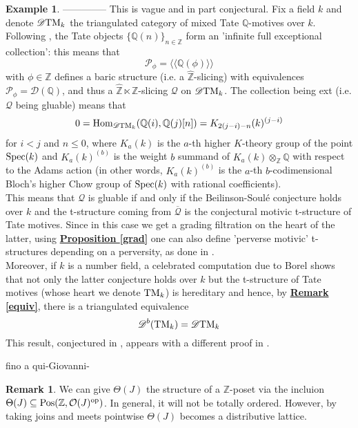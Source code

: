 \documentclass{article}
\theoremstyle{definition}
\newtheorem{exmp}[thm]{Example}
\newtheorem{rem}[thm]{Remark}
\newcommand{\Z}{\mathbb{Z}}
\newcommand{\Oo}{\mathcal{O}}
\newcommand{\per}{\Theta}
\newcommand{\pos}{\textnormal{Pos}}
\newcommand{\op}{\textnormal{op}}
\begin{document}
\begin{exmp}
 --------------
This is vague and in part conjectural. Fix a field $k$ and denote $\mathscr{D}\textnormal{TM}_k$ the triangulated category of mixed Tate $\mathbb{Q}$-motives over $k$. Following \cite{lev}, the Tate objects $\{ \mathbb{Q}(n) \}_{n \in \mathbb{Z}}$ form an 'infinite full exceptional collection': this means that $$\mathscr{P}_{\phi}=\langle \langle \mathbb{Q}(\phi) \rangle \rangle $$ 
with $\phi \in \mathbb{Z}$ defines a baric structure (i.e. a $\hat{\mathbb{Z}}$-slicing) with equivalences $\mathscr{P}_{\phi} = \mathscr{D}(\mathbb{Q})$, and thus a $\hat{\mathbb{Z}} \ltimes \mathbb{Z}$-slicing $\mathscr{Q}$ on $\mathscr{D}\textnormal{TM}_k$. The collection being ext (i.e. $\mathscr{Q}$ being gluable) means that $$0=\textnormal{Hom}_{\mathscr{D}\textnormal{TM}_k}(\mathbb{Q}(i),\mathbb{Q}(j)[n])=K_{2(j-i)-n}(k)^{(j-i)}$$
for $i<j$ and $n \le 0$, where $K_a(k)$ is the $a$-th higher $K$-theory group of the point $\textnormal{Spec}(k)$ and $K_a(k)^{(b)}$ is the weight $b$ summand of $K_a(k) \otimes_{\mathbb{Z}} \mathbb{Q}$ with respect to the Adams action (in other words, $K_a(k)^{(b)}$ is the $a$-th $b$-codimensional Bloch's higher Chow group of $\textnormal{Spec}(k)$ with rational coefficients). \\
This means that $\mathscr{Q}$ is gluable if and only if the Beilinson-Soul\'e conjecture holds over $k$ and the t-structure coming from $\overline{\mathscr{Q}}$ is the conjectural motivic t-structure of Tate motives. Since in this case we get a grading filtration on the heart of the latter, using \hyperref[grad]{\textbf{Proposition \ref*{grad}}} one can also define 'perverse motivic' t-structures depending on a perversity, as done in \cite{soer2}. \\
Moreover, if $k$ is a number field, a celebrated computation due to Borel shows that not only the latter conjecture holds over $k$ but the t-structure of Tate motives (whose heart we denote $\textnormal{TM}_k$) is hereditary and hence, by  \hyperref[equiv]{\textbf{Remark \ref*{equiv}}}, there is a triangulated equivalence $$\mathscr{D}^b(\textnormal{TM}_k)=\mathscr{D}\textnormal{TM}_k$$
This result, conjectured in \cite{lev}, appears with a different proof in \cite{wild}. 

\end{exmp} 


{\Huge fino a qui-Giovanni-} 



\begin{rem}
We can give $\per(J)$ the structure of a $\Z$-poset via the incluion $\per(J) \subseteq \pos(\Z,\Oo(J)^\op)$. In general, it will not be totally ordered. However, by taking joins and meets pointwise $\per(J)$ becomes a distributive lattice. 
\end{rem}
\end{document}
